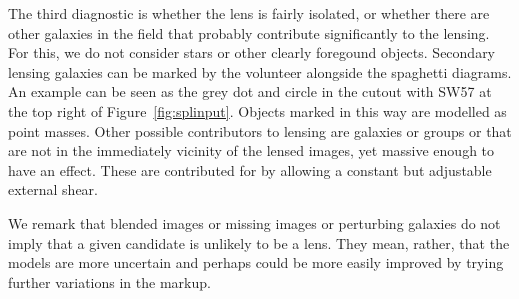 The third diagnostic is whether the lens is fairly isolated, or
whether there are other galaxies in the field that probably contribute
significantly to the lensing.  For this, we do not consider stars or
other clearly foregound objects.  Secondary lensing galaxies can be
marked by the volunteer alongside the spaghetti diagrams.  An example
can be seen as the grey dot and circle in the cutout with SW57 at the
top right of Figure~\ref{fig:splinput}.  Objects marked in this way
are modelled as point masses.  Other possible contributors to lensing
are galaxies or groups or that are not in the immediately vicinity of
the lensed images, yet massive enough to have an effect.  These are
contributed for by allowing a constant but adjustable external shear.

We remark that blended images or missing images or perturbing galaxies
do not imply that a given candidate is unlikely to be a lens.  They
mean, rather, that the models are more uncertain and perhaps could be
more easily improved by trying further variations in the markup.


